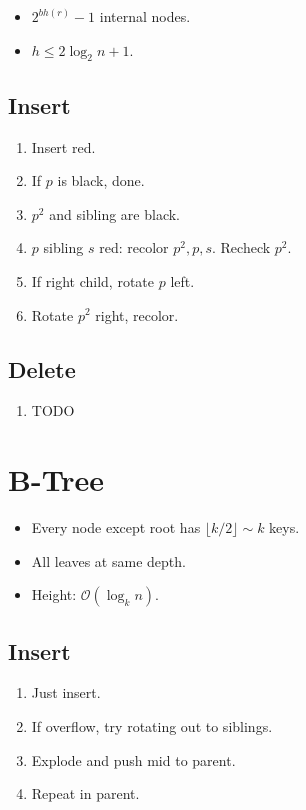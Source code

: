 \documentclass[11pt]{article}
\begin{document}
\begin{multicols}{4}
\begin{itemize}
	\item $2^{bh(r)} -1$ internal nodes.
	\item $h \le 2 \log_2{n+1}$.
\end{itemize}

\subsection{Insert}

\begin{enumerate}
	\item Insert red.
	\item If $p$ is black, done.
	\item $p^2$ and sibling are black.
	\item $p$ sibling $s$ red: recolor $p^2, p, s$. Recheck $p^2$.
	\item If right child, rotate $p$ left.
	\item Rotate $p^2$ right, recolor.
\end{enumerate}

\subsection{Delete}

\begin{enumerate}
	\item TODO
\end{enumerate}

\section{B-Tree}

\begin{itemize}
	\item Every node except root has $\lfloor k/2 \rfloor \sim k$ keys.
	\item All leaves at same depth.
	\item Height: $\mathcal{O}(\log_k{n})$.
\end{itemize}

\subsection{Insert}

\begin{enumerate}
	\item Just insert.
	\item If overflow, try rotating out to siblings.
	\item Explode and push mid to parent.
	\item Repeat in parent.
\end{enumerate}


\end{multicols}
\end{document}
